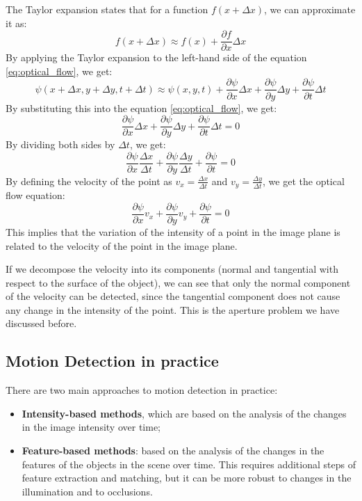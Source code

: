 The Taylor expansion states that for a function $f(x + \Delta x)$, we can approximate it as:
\begin{equation*}
    f(x + \Delta x) \approx f(x) + \frac{\partial f}{\partial x} \Delta x
\end{equation*}
By applying the Taylor expansion to the left-hand side of the equation \ref{eq:optical_flow}, we get:
\begin{equation*}
    \psi(x + \Delta x, y + \Delta y, t + \Delta t) \approx \psi(x, y, t) + \frac{\partial \psi}{\partial x} \Delta x + \frac{\partial \psi}{\partial y} \Delta y + \frac{\partial \psi}{\partial t} \Delta t
\end{equation*}
By substituting this into the equation \ref{eq:optical_flow}, we get:
\begin{equation*}
    \frac{\partial \psi}{\partial x} \Delta x + \frac{\partial \psi}{\partial y} \Delta y + \frac{\partial \psi}{\partial t} \Delta t = 0
\end{equation*}
By dividing both sides by $\Delta t$, we get:
\begin{equation*}
    \frac{\partial \psi}{\partial x} \frac{\Delta x}{\Delta t} + \frac{\partial \psi}{\partial y} \frac{\Delta y}{\Delta t} + \frac{\partial \psi}{\partial t} = 0
\end{equation*}
By defining the velocity of the point as $v_x = \frac{\Delta x}{\Delta t}$ and $v_y = \frac{\Delta y}{\Delta t}$, we get the optical flow equation:
\begin{equation}
    \frac{\partial \psi}{\partial x} v_x + \frac{\partial \psi}{\partial y} v_y + \frac{\partial \psi}{\partial t} = 0
\end{equation}
This implies that the variation of the intensity of a point in the image plane is related to the velocity of the point in the image plane. 

If we decompose the velocity into its components (normal and tangential with respect to the surface of the object),
we can see that only the normal component of the velocity can be detected, since the tangential component does not cause any change in the intensity of the point. 
This is the aperture problem we have discussed before.

\subsection{Motion Detection in practice}
There are two main approaches to motion detection in practice:
\begin{itemize}
    \item \textbf{Intensity-based methods}, which are based on the analysis of the changes in the image intensity over time;
    \item \textbf{Feature-based methods}: based on the analysis of the changes in the features of the objects in the scene over time.
    This requires additional steps of feature extraction and matching, but it can be more robust to changes in the illumination and to occlusions.
\end{itemize}

